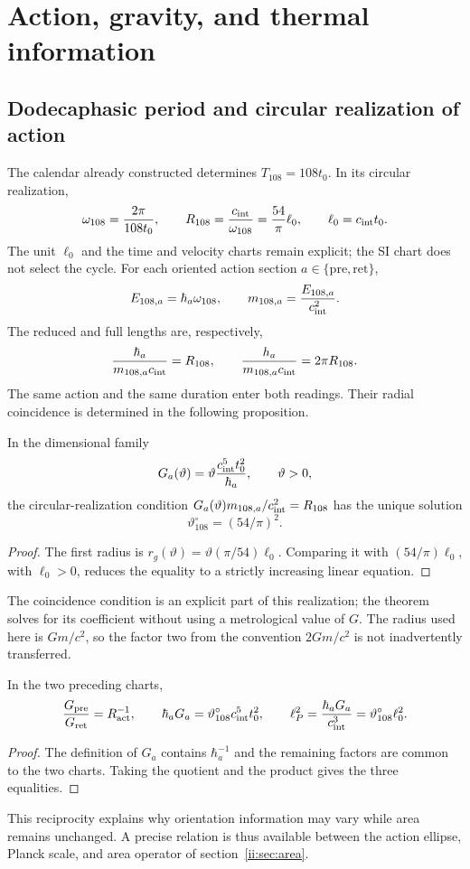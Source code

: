 \section{Action, gravity, and thermal information}
\label{ii:sec:gravity}
\subsection{Dodecaphasic period and circular realization of action}
The calendar already constructed determines $T_{108}=108t_0$.
In its circular realization,
\[
\omega_{108}=\frac{2\pi}{108t_0},\qquad
R_{108}=\frac{c_{\rm int}}{\omega_{108}}
=\frac{54}{\pi}\ell_0,\qquad \ell_0=c_{\rm int}t_0.
\]
The unit $\ell_0$ and the time and velocity charts remain
explicit; the SI chart does not select the cycle.
For each oriented action section $a\in\{\mathrm{pre},\mathrm{ret}\}$,
\[
E_{108,a}=\hbar_a\omega_{108},\qquad
m_{108,a}=\frac{E_{108,a}}{c_{\rm int}^2}.
\]
The reduced and full lengths are, respectively,
\[
\frac{\hbar_a}{m_{108,a}c_{\rm int}}=R_{108},
\qquad
\frac{h_a}{m_{108,a}c_{\rm int}}=2\pi R_{108}.
\]
The same action and the same duration enter both readings. Their radial coincidence is determined in the following proposition.

\begin{proposition}
In the dimensional family
\[
G_a(\vartheta)=\vartheta\frac{c_{\rm int}^5t_0^2}{\hbar_a},
\qquad \vartheta>0,
\]
the circular-realization condition
$G_a(\vartheta)m_{108,a}/c_{\rm int}^2=R_{108}$
has the unique solution
\[
\vartheta^\circ_{108}=(54/\pi)^2.
\]
\end{proposition}
\begin{proof}
The first radius is
$r_g(\vartheta)=\vartheta(\pi/54)\ell_0$.
Comparing it with $(54/\pi)\ell_0$, with $\ell_0>0$, reduces the
equality to a strictly increasing linear equation.
\end{proof}
The coincidence condition is an explicit part of this realization;
the theorem solves for its coefficient without using a metrological value of $G$.
The radius used here is $Gm/c^2$, so the factor two from
the convention $2Gm/c^2$ is not inadvertently transferred.

\begin{proposition}
In the two preceding charts,
\[
\frac{G_{\rm pre}}{G_{\rm ret}}=R_{\rm act}^{-1},\qquad
\hbar_aG_a=\vartheta^\circ_{108}c_{\rm int}^5t_0^2,
\qquad
\ell_P^2=\frac{\hbar_aG_a}{c_{\rm int}^3}
=\vartheta^\circ_{108}\ell_0^2.
\]
\end{proposition}
\begin{proof}
The definition of $G_a$ contains $\hbar_a^{-1}$ and the remaining factors
are common to the two charts. Taking the quotient and the product gives
the three equalities.
\end{proof}
This reciprocity explains why orientation information may
vary while area remains unchanged. A precise relation is thus available
between the action ellipse, Planck scale, and area operator
of section~\ref{ii:sec:area}.

